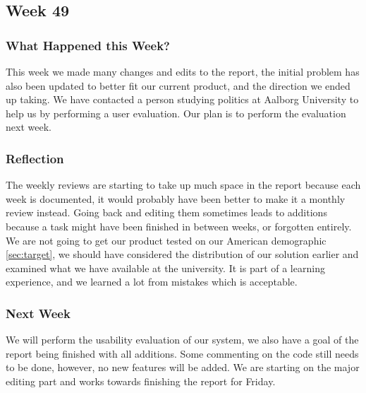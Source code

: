 \subsection{Week 49}
\subsubsection{What Happened this Week?}
This week we made many changes and edits to the report, the initial problem has
also been updated to better fit our current product, and the direction we ended
up taking. We have contacted a person studying politics at Aalborg University to
help us by performing a user evaluation. Our plan is to perform the evaluation
next week.

\subsubsection{Reflection}
The weekly reviews are starting to take up much space in the report because each
week is documented, it would probably have been better to make it a monthly
review instead. Going back and editing them sometimes leads to additions because
a task might have been finished in between weeks, or forgotten entirely. We are
not going to get our product tested on our American demographic
\autoref{sec:target}, we should have considered the distribution of our solution
earlier and examined what we have available at the university. It is part of a
learning experience, and we learned a lot from mistakes which is
acceptable.

\subsubsection{Next Week}
We will perform the usability evaluation of our system, we also have a goal of
the report being finished with all additions. Some commenting on the code still
needs to be done, however, no new features will be added. We are starting on the
major editing part and works towards finishing the report for Friday.



% 
% 
% 

